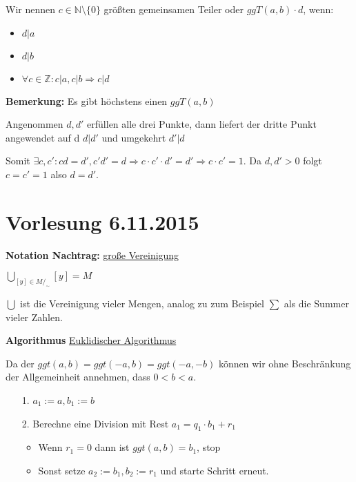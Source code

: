 \documentclass[pdftex,12pt,a4paper,fleqn]{scrartcl}
\begin{document}
Wir nennen $c \in \mathbb{N}\setminus \{0\}$ größten gemeinsamen Teiler oder $ggT(a,b) \cdot d$, wenn:

\begin{itemize}
	\item $d | a$
	\item $d | b$
	\item $\forall c \in \mathbb{Z}: c | a, c | b \Rightarrow c | d$
\end{itemize}

\textbf{Bemerkung:} Es gibt höchstens einen $ggT(a,b)$

Angenommen $d,d'$ erfüllen alle drei Punkte, dann liefert der dritte Punkt angewendet auf d $d | d'$ und umgekehrt $d' | d$

Somit $\exists c,c' : cd=d', c'd'=d \Rightarrow c\cdot c' \cdot d' = d' \Rightarrow c \cdot c' = 1$. Da $d,d' > 0$ folgt $c = c' = 1$ also $d = d'$.



\section{Vorlesung 6.11.2015} %
\label{sec:vorlesung_6_11_2015}

\textbf{Notation Nachtrag:} \underline{große Vereinigung}

$\bigcup_{[y] \in M/_\sim} [y] = M$

$\bigcup$ ist die Vereinigung vieler Mengen, analog zu zum Beispiel $\sum$ als die Summer vieler Zahlen.

\textbf{Algorithmus} \underline{Euklidischer Algorithmus}

Da der $ggt(a,b) = ggt(-a,b) = ggt(-a,-b)$ können wir ohne Beschränkung der Allgemeinheit annehmen, dass $0 < b < a$.

\begin{itemize}
	\item[1.] $a_1 := a, b_1 := b$
	\item[2.] Berechne eine Division mit Rest $a_1 = q_1 \cdot b_1 + r_1$
	\begin{itemize}
		\item Wenn $r_1 = 0$ dann ist $ggt(a,b) = b_1$, stop
		\item Sonst setze $a_2 := b_1, b_2 := r_1$ und starte Schritt erneut.
	\end{itemize}
\end{itemize}
\end{document}
